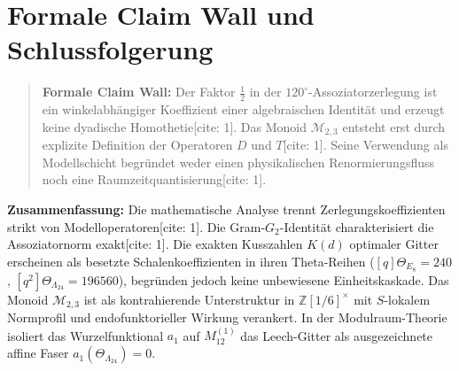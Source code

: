 \documentclass[11pt,a4paper]{article}
\begin{document}
	\section{Formale Claim Wall und Schlussfolgerung}
	
	\begin{quote}
		\textbf{Formale Claim Wall:} Der Faktor $\frac{1}{2}$ in der $120^\circ$-Assoziatorzerlegung ist ein winkelabhängiger Koeffizient einer algebraischen Identität und erzeugt keine dyadische Homothetie[cite: 1]. Das Monoid $\mathcal{M}_{2,3}$ entsteht erst durch explizite Definition der Operatoren $D$ und $T$[cite: 1]. Seine Verwendung als Modellschicht begründet weder einen physikalischen Renormierungsfluss noch eine Raumzeitquantisierung[cite: 1].
	\end{quote}
	
	\noindent \textbf{Zusammenfassung:} Die mathematische Analyse trennt Zerlegungskoeffizienten strikt von Modelloperatoren[cite: 1]. Die Gram-$G_2$-Identität charakterisiert die Assoziatornorm exakt[cite: 1]. Die exakten Kusszahlen $K(d)$ optimaler Gitter erscheinen als besetzte Schalenkoeffizienten in ihren Theta-Reihen ($[q]\Theta_{E_8}=240$, $[q^2]\Theta_{\Lambda_{24}}=196560$), begründen jedoch keine unbewiesene Einheitskaskade. Das Monoid $\mathcal{M}_{2,3}$ ist als kontrahierende Unterstruktur in $\mathbb{Z}[1/6]^\times$ mit $S$-lokalem Normprofil und endofunktorieller Wirkung verankert. In der Modulraum-Theorie isoliert das Wurzelfunktional $a_1$ auf $M_{12}^{(1)}$ das Leech-Gitter als ausgezeichnete affine Faser $a_1(\Theta_{\Lambda_{24}}) = 0$.
	
\end{document}
